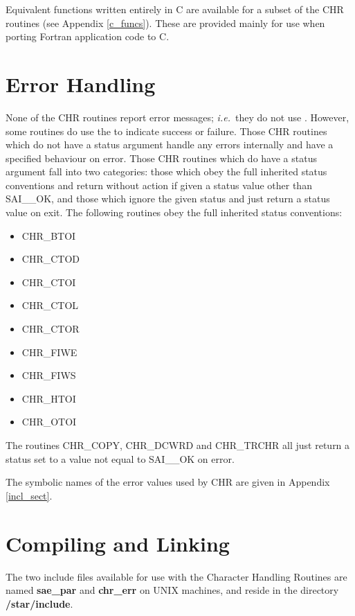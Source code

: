 \documentclass[twoside,11pt,nolof]{starlink}
\begin{document}
Equivalent functions written entirely in C are available for a subset of
the CHR routines (see Appendix \ref{c_funcs}). These are provided mainly
for use when porting Fortran application code to C.

\section {Error Handling \label{err_sect} }

None of the CHR routines report error messages; \emph{i.e.}\ they do not use
.
However, some routines do use the
to indicate success or failure.
Those CHR routines which do not have a status argument handle any errors
internally and have a specified behaviour on error.
Those CHR routines which do have a status argument fall into two categories:
those which obey the full inherited status conventions and return without
action if given a status value other than SAI\_\_OK, and those which ignore
the given status and just return a status value on exit.
The following routines obey the full inherited status conventions:

\begin {itemize}
\item CHR\_BTOI
\item CHR\_CTOD
\item CHR\_CTOI
\item CHR\_CTOL
\item CHR\_CTOR
\item CHR\_FIWE
\item CHR\_FIWS
\item CHR\_HTOI
\item CHR\_OTOI
\end {itemize}

The routines CHR\_COPY, CHR\_DCWRD and CHR\_TRCHR all just return a status
set to a value not equal to SAI\_\_OK on error.

The symbolic names of the error values used by CHR are given in Appendix
\ref{incl_sect}.


\section {Compiling and Linking \label{compile_sect}}
The two include files available for use with the Character Handling Routines
are named \textbf{sae\_par} and \textbf{chr\_err} on UNIX
machines, and reside in the directory \textbf{/star/include}.
\end{document}
